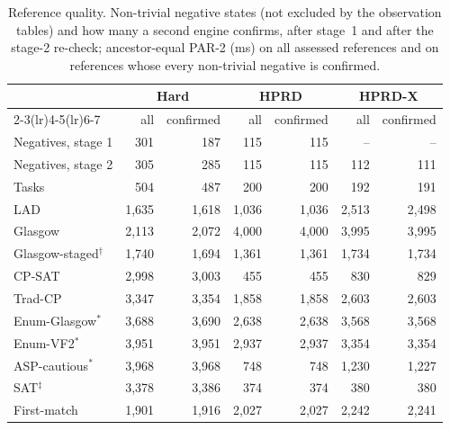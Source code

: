 \begin{table}[t]
\caption{Reference quality. Non-trivial negative states (not excluded by the observation tables) and how many a second engine confirms, after stage~1 and after the stage-2 re-check; ancestor-equal PAR-2 (ms) on all assessed references and on references whose every non-trivial negative is confirmed.}
\label{tab:refs}
\centering\footnotesize
\setlength{\tabcolsep}{3pt}
\begin{tabular}{lrrrrrr}
\toprule
 & \multicolumn{2}{c}{Hard} & \multicolumn{2}{c}{HPRD} & \multicolumn{2}{c}{HPRD-X}\\
\cmidrule(lr){2-3}\cmidrule(lr){4-5}\cmidrule(lr){6-7}
 & all & confirmed & all & confirmed & all & confirmed\\
\midrule
Negatives, stage 1 & 301 & 187 & 115 & 115 & -- & --\\
Negatives, stage 2 & 305 & 285 & 115 & 115 & 112 & 111\\
Tasks & 504 & 487 & 200 & 200 & 192 & 191\\
\midrule
LAD & 1,635 & 1,618 & 1,036 & 1,036 & 2,513 & 2,498\\
Glasgow & 2,113 & 2,072 & 4,000 & 4,000 & 3,995 & 3,995\\
Glasgow-staged$^\dagger$ & 1,740 & 1,694 & 1,361 & 1,361 & 1,734 & 1,734\\
CP-SAT & 2,998 & 3,003 & 455 & 455 & 830 & 829\\
Trad-CP & 3,347 & 3,354 & 1,858 & 1,858 & 2,603 & 2,603\\
Enum-Glasgow$^\ast$ & 3,688 & 3,690 & 2,638 & 2,638 & 3,568 & 3,568\\
Enum-VF2$^\ast$ & 3,951 & 3,951 & 2,937 & 2,937 & 3,354 & 3,354\\
ASP-cautious$^\ast$ & 3,968 & 3,968 & 748 & 748 & 1,230 & 1,227\\
SAT$^\ddagger$ & 3,378 & 3,386 & 374 & 374 & 380 & 380\\
First-match & 1,901 & 1,916 & 2,027 & 2,027 & 2,242 & 2,241\\
\bottomrule
\end{tabular}
\end{table}
